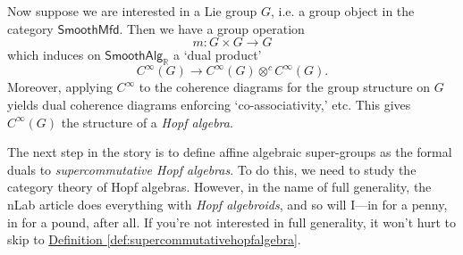 \documentclass[a4paper]{report}
\newcommand{\R}{\mathbb{R}}
\theoremstyle{definition}
\theoremstyle{plain}
\theoremstyle{remark}
\begin{document}
Now suppose we are interested in a Lie group $G$, i.e. a group object in the category $\mathsf{SmoothMfd}$. Then we have a group operation 
\begin{equation*}
  m\colon G \times G \to G
\end{equation*}
which induces on $\mathsf{SmoothAlg}_{\R}$ a `dual product' 
\begin{equation*}
  C^{\infty}(G) \to C^{\infty} (G) \otimes^{c} C^{\infty}(G).
\end{equation*}
Moreover, applying $C^{\infty}$ to the coherence diagrams for the group structure on $G$ yields dual coherence diagrams enforcing `co-associativity,' etc. This gives $C^{\infty}(G)$ the structure of a \emph{Hopf algebra}.

The next step in the story is to define affine algebraic super-groups as the formal duals to \emph{supercommutative Hopf algebras}. To do this, we need to study the category theory of Hopf algebras. However, in the name of full generality, the nLab article \cite{nlab-deligne-theorem} does everything with \emph{Hopf algebroids}, and so will I---in for a penny, in for a pound, after all. If you're not interested in full generality, it won't hurt to skip to \hyperref[def:supercommutativehopfalgebra]{Definition \ref*{def:supercommutativehopfalgebra}}.
\end{document}
